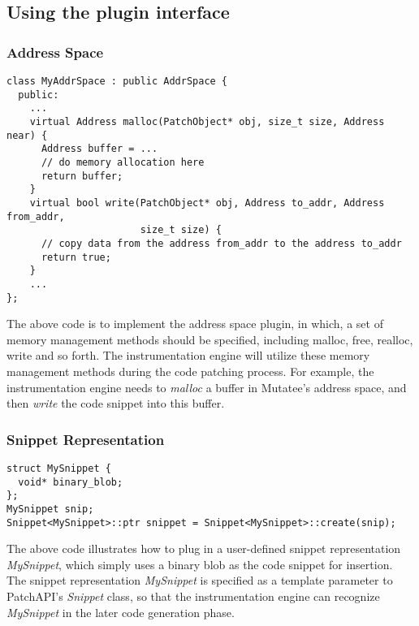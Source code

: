 \subsection{Using the plugin interface}

\subsubsection{Address Space}
\lstset{numbers=left}
\begin{lstlisting}[caption=Example of implementing address space plugin]
class MyAddrSpace : public AddrSpace {
  public:
    ...
    virtual Address malloc(PatchObject* obj, size_t size, Address near) {
      Address buffer = ...
      // do memory allocation here
      return buffer;
    }
    virtual bool write(PatchObject* obj, Address to_addr, Address from_addr,
                       size_t size) {
      // copy data from the address from_addr to the address to_addr
      return true;
    }
    ...
};
\end{lstlisting}
The above code is to implement the address space plugin, in which, a set of
memory management methods should be specified, including malloc, free, realloc,
write and so forth. The instrumentation engine will utilize these memory
management methods during the code patching process. For example, the
instrumentation engine needs to \emph{malloc} a buffer in Mutatee's address
space, and then \emph{write} the code snippet into this buffer.

\subsubsection{Snippet Representation} \label{sec-example-snip}
\lstset{numbers=left}
\begin{lstlisting}[caption=Example of implementing snippet plugin]
struct MySnippet {
  void* binary_blob;
};
MySnippet snip;
Snippet<MySnippet>::ptr snippet = Snippet<MySnippet>::create(snip);
\end{lstlisting}
The above code illustrates how to plug in a user-defined snippet representation
\emph{MySnippet}, which simply uses a binary blob as the code snippet for
insertion. The snippet representation \emph{MySnippet} is specified as a
template parameter to PatchAPI's \emph{Snippet} class, so that the
instrumentation engine can recognize \emph{MySnippet} in the later code
generation phase.

